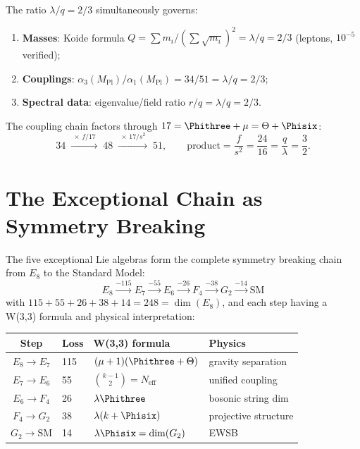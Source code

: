 \begin{theorem}
The ratio $\lambda/q = 2/3$ simultaneously governs:
\begin{enumerate}[nosep]
\item \textbf{Masses}: Koide formula
  $Q = \sum m_i/(\sum\sqrt{m_i})^2 = \lambda/q = 2/3$ (leptons, $10^{-5}$ verified);
\item \textbf{Couplings}: $\alpha_3(M_{\mathrm{Pl}})/\alpha_1(M_{\mathrm{Pl}}) = 34/51 = \lambda/q = 2/3$;
\item \textbf{Spectral data}: eigenvalue/field ratio $r/q = \lambda/q = 2/3$.
\end{enumerate}
\end{theorem}

The coupling chain factors through $17 = \Phithree+\mu = \Theta+\Phisix$:
\begin{equation}
34 \;\xrightarrow{\;\times\,f/17\;}\; 48
\;\xrightarrow{\;\times\,17/s^2\;}\; 51, \qquad
\text{product} = \frac{f}{s^2} = \frac{24}{16} = \frac{q}{\lambda} = \frac{3}{2}.
\end{equation}


\section{The Exceptional Chain as Symmetry Breaking}
\label{sec:exceptional-chain}

\begin{theorem}
The five exceptional Lie algebras form the complete symmetry
breaking chain from $E_8$ to the Standard Model:
\begin{equation}
\boxed{
E_8 \xrightarrow{-115} E_7 \xrightarrow{-55} E_6
\xrightarrow{-26} F_4 \xrightarrow{-38} G_2 \xrightarrow{-14} \mathrm{SM}
}
\end{equation}
with $115+55+26+38+14 = 248 = \dim(E_8)$, and each step having a
W(3,3) formula and physical interpretation:
\end{theorem}

\begin{center}
\begin{tabular}{@{}clll@{}}
\toprule
\textbf{Step} & \textbf{Loss} & \textbf{W(3,3) formula} & \textbf{Physics} \\
\midrule
$E_8\to E_7$ & 115 & $(\mu+1)(\Phithree+\Theta)$ & gravity separation \\
$E_7\to E_6$ & 55 & $\binom{k-1}{2} = N_{\mathrm{eff}}$ & unified coupling \\
$E_6\to F_4$ & 26 & $\lambda\Phithree$ & bosonic string dim \\
$F_4\to G_2$ & 38 & $\lambda(k+\Phisix)$ & projective structure \\
$G_2\to\mathrm{SM}$ & 14 & $\lambda\Phisix = \dim(G_2)$ & EWSB \\
\bottomrule
\end{tabular}
\end{center}

